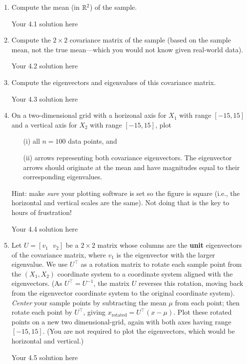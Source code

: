 \documentclass[11pt]{article}
\begin{document}
\begin{enumerate}
\item
Compute the mean (in $\mathbb{R}^2$) of the sample.

\begin{solution}
Your 4.1 solution here
\end{solution}
\item
Compute the $2 \times 2$ covariance matrix of the sample (based on the sample mean, not the true mean---which you would not know given real-world data).

\begin{solution}
Your 4.2 solution here
\end{solution}

\item
Compute the eigenvectors and eigenvalues of this covariance matrix.

\begin{solution}
Your 4.3 solution here
\end{solution}
\item
On a two-dimensional grid with a horizonal axis for $X_1$ with range $[-15, 15]$ and a vertical axis for $X_2$ with range $[-15, 15]$, plot
\begin{itemize}
	\item[(i)] all $n=100$ data points, and
	\item[(ii)] arrows representing both covariance eigenvectors.  The eigenvector arrows should originate at the mean and have magnitudes equal to their corresponding eigenvalues.
\end{itemize}
Hint:  make {\em sure} your plotting software is set so the figure is square (i.e., the horizontal and vertical scales are the same). Not doing that is the key to hours of frustration!

\begin{solution}
Your 4.4 solution here
\end{solution}
\item
Let $U = [v_1~~~v_2]$ be a $2 \times 2$ matrix whose columns are the {\bf unit} eigenvectors of the covariance matrix, where $v_1$ is the eigenvector with the larger eigenvalue.  We use $U^\top$ as a rotation matrix to rotate each sample point from the $(X_1, X_2)$ coordinate system to a coordinate system aligned with the eigenvectors.  (As $U^\top = U^{-1}$, the matrix $U$ reverses this rotation, moving back from the eigenvector coordinate system to the original coordinate system).  {\em Center} your sample points by subtracting the mean $\mu$ from each point; then rotate each point by $U^\top$, giving $x_{\mathrm{rotated}}=U^\top(x - \mu)$.  Plot these rotated points on a new two dimensional-grid, again with both axes having range $[-15, 15]$.
(You are not required to plot the eigenvectors, which would be horizontal and vertical.)

\begin{solution}
Your 4.5 solution here
\end{solution}
\end{enumerate}
\end{document}
